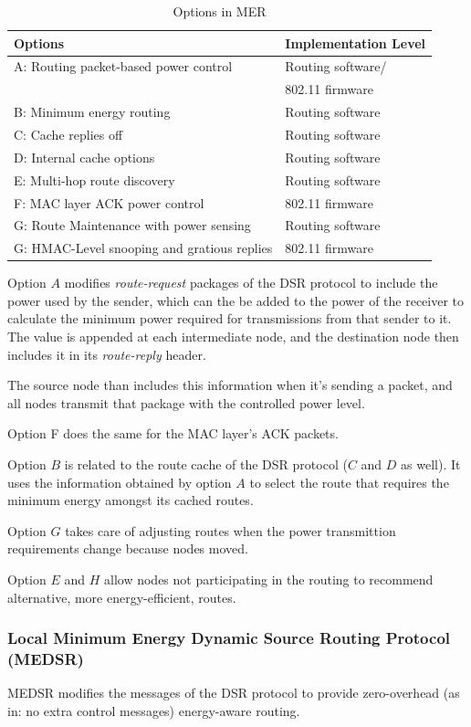 \begin{table}[tb]
  \begin{tabular}{ll}
    Options & Implementation Level  \\
    \hline
    A: Routing packet-based power control & Routing software/\\ &802.11 firmware \\
    B: Minimum energy routing & Routing software \\
    C: Cache replies off & Routing software \\
    D: Internal cache options & Routing software \\
    E: Multi-hop route discovery & Routing software \\
    F: MAC layer ACK power control & 802.11 firmware \\
    G: Route Maintenance with power sensing & Routing software \\
    G: HMAC-Level snooping and gratious replies & 802.11 firmware \\
  \end{tabular}
  \caption{Options in MER}
  \label{tbl:mer-options}
\end{table}

Option $A$ modifies \textit{route-request} packages of the DSR protocol to
include the power used by the sender, which can the be added to the power
of the receiver to calculate the minimum power required for transmissions
from that sender to it. The value is appended at each intermediate node, and the
destination node then includes it in its \textit{route-reply} header.

The source node than includes this information when it's sending a packet, and
all nodes transmit that package with the controlled power level.

Option F does the same for the MAC layer's ACK packets.

Option $B$ is related to the route cache of the DSR protocol ($C$ and $D$ as well). It
uses the information obtained by option $A$ to select the route that requires
the minimum energy amongst its cached routes.

Option $G$ takes care of adjusting routes when the power transmittion requirements
change because nodes moved.

Option $E$ and $H$ allow nodes not participating in the routing to recommend
alternative, more energy-efficient, routes.
\subsubsection{Local Minimum Energy Dynamic Source Routing Protocol (MEDSR)}
MEDSR\cite{tanque2007minimum} modifies the messages of the DSR protocol to
provide zero-overhead (as in: no extra control messages) energy-aware routing.

